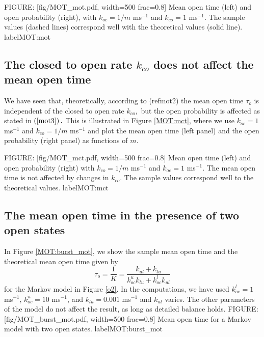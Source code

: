 FIGURE: [fig/MOT_mot.pdf, width=500 frac=0.8] Mean open time (left) and open probability (right), with $k_{oc}=1/m$ ms$^{-1}$ and $k_{co}=1$ ms$^{-1}$. The sample
values (dashed lines) correspond well with the theoretical values (solid line). label{MOT:mot}
\subsection{The closed to open rate $k_{co}$ does not affect the mean open
time}

We have seen that, theoretically, according to (ref{mot2})
the mean open time $\tau_{o}$ is independent of the closed to open rate
$k_{co},$ but the open probability is affected as stated in $\left(
\ref{mot3}\right)  .$ This is illustrated in Figure \ref{MOT:mct}, where we use
$k_{oc}=1$ ms$^{-1}$ and $k_{co}=1/m$ ms$^{-1}$ 
and plot the mean open time (left panel) and the open
probability (right panel) as functions of $m.$

FIGURE: [fig/MOT_mct.pdf, width=500 frac=0.8] Mean open time (left) and open probability (right) with $k_{co}=1/m$ ms$^{-1}$ and $k_{oc}=1$ ms$^{-1}$. The mean open
time is not affected by changes in $k_{co}$. The sample values correspond well to 
the theoretical values. label{MOT:mct}
\subsection{The mean open time in the presence of two open states}
In Figure \ref{MOT:burst_mot}, we show the sample mean open time and the theoretical mean open time given by 
\begin{equation}
\tau_{o}=\frac{1}{K}=\frac{k_{ul}+k_{lu}}{k_{oc}^{u}k_{lu}+k_{oc}^{l}k_{ul}} 
\end{equation}
for the Markov model in Figure \ref{o2}. In the computations, we have used $k^l_{oc} = 1$ ms$^{-1}$, $k^u_{oc} = 10$ ms$^{-1}$, and $k_{lu}  = 0.001$ ms$^{-1}$ and $k_{ul}$ varies. The other parameters of the model do not affect the result, as long as detailed balance holds.
FIGURE: [fig/MOT_burst_mot.pdf, width=500 frac=0.8] Mean open time for a Markov model with two open states. label{MOT:burst_mot}
